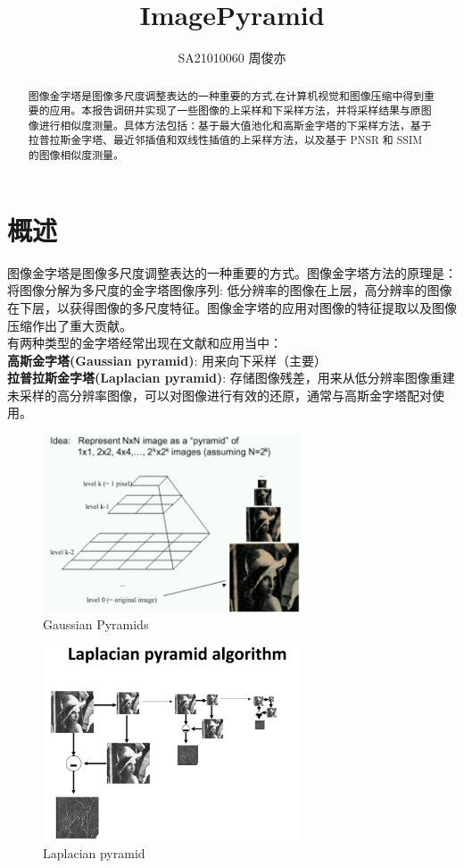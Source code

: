\documentclass[12pt]{article}
\title{\LARGE\textbf{ImagePyramid}}
\author{SA21010060 周俊亦}
\date{}
\begin{document}
	\maketitle
	\renewcommand{\abstractname}{Abstract}
	\begin{abstract}
		图像金字塔是图像多尺度调整表达的一种重要的方式,在计算机视觉和图像压缩中得到重要的应用。本报告调研并实现了一些图像的上采样和下采样方法，并将采样结果与原图像进行相似度测量。具体方法包括：基于最大值池化和高斯金字塔的下采样方法，基于拉普拉斯金字塔、最近邻插值和双线性插值的上采样方法，以及基于 PNSR 和 SSIM 的图像相似度测量。
	\end{abstract}
	
	\section{概述}
	图像金字塔是图像多尺度调整表达的一种重要的方式。图像金字塔方法的原理是：将图像分解为多尺度的金字塔图像序列: 低分辨率的图像在上层，高分辨率的图像在下层，以获得图像的多尺度特征。图像金字塔的应用对图像的特征提取以及图像压缩作出了重大贡献。\\
	
	
	有两种类型的金字塔经常出现在文献和应用当中：\\
	
	
	\textbf{高斯金字塔(Gaussian pyramid)}: 用来向下采样（主要）\\
	
	
	\textbf{拉普拉斯金字塔(Laplacian pyramid)}: 存储图像残差，用来从低分辨率图像重建未采样的高分辨率图像，可以对图像进行有效的还原，通常与高斯金字塔配对使用。
	
	\begin{figure}[H]
		\centering
		\includegraphics[width=3in]{./gausspyr.png}
		\centering
		\caption{Gaussian Pyramids}
	\end{figure}
	
	\begin{figure}[H]
		\centering
		\includegraphics[width=3in]{./laplacepyr.png}
		\centering
		\caption{Laplacian pyramid}
	\end{figure}
	
\end{document}
